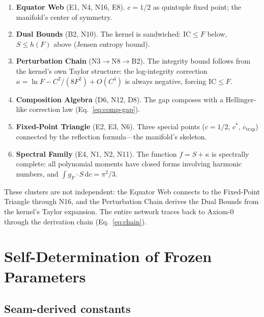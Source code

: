 \documentclass[
  aps,
  prd,
  twocolumn,
  superscriptaddress,
  nofootinbib,
  floatfix
]{revtex4-2}
\newcommand{\dd}{\mathrm{d}}
\newcommand{\IC}{\mathrm{IC}}
\newcommand{\gF}{g_{\!F}}
\begin{document}
\begin{enumerate}[leftmargin=*,label=\textbf{\arabic*.}]
\item \textbf{Equator Web} (E1, N4, N16, E8).  $c = 1/2$ as
  quintuple fixed point; the manifold's center of symmetry.

\item \textbf{Dual Bounds} (B2, N10).  The kernel is sandwiched:
  $\IC \leq F$ below, $S \leq h(F)$ above (Jensen entropy bound).

\item \textbf{Perturbation Chain} (N3$\to$N8$\to$B2).  The integrity
  bound follows from the kernel's own Taylor structure: the
  log-integrity correction $\kappa = \ln F - C^2/(8F^2) + O(C^4)$
  is always negative, forcing $\IC \leq F$.

\item \textbf{Composition Algebra} (D6, N12, D8).  The gap composes
  with a Hellinger-like correction law (Eq.~\ref{eq:comp-gap}).

\item \textbf{Fixed-Point Triangle} (E2, E3, N6).  Three special
  points ($c = 1/2$, $c^*$, $c_{\mathrm{trap}}$) connected by the
  reflection formula---the manifold's skeleton.

\item \textbf{Spectral Family} (E4, N1, N2, N11).  The function
  $f = S + \kappa$ is spectrally complete: all polynomial moments
  have closed forms involving harmonic numbers, and $\int \gF \cdot
  S\,\dd c = \pi^2/3$.
\end{enumerate}

\noindent These clusters are not independent: the Equator Web connects
to the Fixed-Point Triangle through N16, and the Perturbation Chain
derives the Dual Bounds from the kernel's Taylor expansion.  The
entire network traces back to Axiom-0 through the derivation chain
(Eq.~\ref{eq:chain}).

\section{Self-Determination of Frozen Parameters}\label{sec:frozen}

\subsection{Seam-derived constants}
\end{document}
